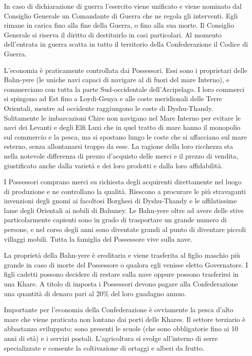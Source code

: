 In caso di dichiarazione di guerra l'esercito viene unificato e viene
nominato dal Consiglio Generale un Comandante di Guerra che ne regola
gli interventi.  Egli rimane in carica fino alla fine della Guerra, o
fino alla sua morte. Il Consiglio Generale si riserva il diritto di
destituirlo in casi particolari.  Al momento dell'entrata in guerra
scatta in tutto il territorio della Confederazione il Codice di
Guerra.

\Economia L'economia \`e praticamente controllata
dai Possessori.  Essi sono i proprietari delle Bahn-yere (le uniche
navi capaci di navigare al di fuori del mare Interno), e commerciano
con tutta la parte Sud-occidentale dell'Arcipelago. I loro commerci si
spingono ad Est fino a Loydi-Genya e alle coste meridionali delle
Terre Orientali, mentre ad occidente raggiungono le coste di
Dyshu-Thandy. Solitamente le imbarcazioni Chire non navigano nel Mare
Interno per evitare le navi dei Levanti e degli Elfi Luxi che in quel
tratto di mare hanno il monopolio sul commercio e la pesca, ma si
spostano lungo le coste che si affacciano sul mare esterno, senza
allontanarsi troppo da esse.  La ragione della loro ricchezza sta
nella notevole differenza di prezzo d'acquisto delle merci e il prezzo
di vendita, giustificato anche dalla variet\`a e dei loro prodotti e
dalla loro affidabilit\`a.

I Possessori comprano merci su richiesta degli acquirenti direttamente
nel luogo di produzione e ne controllano la qualit\`a. Riescono a
procurare le pi\`u stravaganti invenzioni degli gnomi ai facoltosi
Borghesi di Dyshu-Thandy e le affilatissime lame degli Orientali ai
nobili di Bahuney. Le Bahn-yere oltre ad avere delle stive
particolarmente capienti sono in grado di trasportare un grande numero
di persone, e nel corso degli anni sono diventate grandi al punto di
diventare piccoli villaggi mobili. Tutta la famiglia del Possessore
vive sulla nave.

La propriet\`a della Bahn-yere \`e ereditaria e viene trasferita al
figlio maschio pi\`u grande in caso di morte del Possessore o qualora
egli venisse eletto Governatore. I figli cadetti possono decidere di
restare sulla nave oppure possono trasferirsi in una Khare. A titolo
di imposta i Possessori devono pagare alla Confederazione una
quantit\`a di denaro pari al 20\% del loro guadagno annuo.

Importante per l'economia della Confederazione \`e ovviamente la pesca
d'alto mare che viene praticata non lontano dai porti delle Khares. Il
settore terziario \`e abbastanza sviluppato: sono presenti le scuole
(che sono obbligatorie fino ai 10 anni di et\`a) e i servizi postali.
L'agricoltura si svolge all'interno di serre specializzate e consente
la coltivazione di ortaggi e alberi da frutto.

